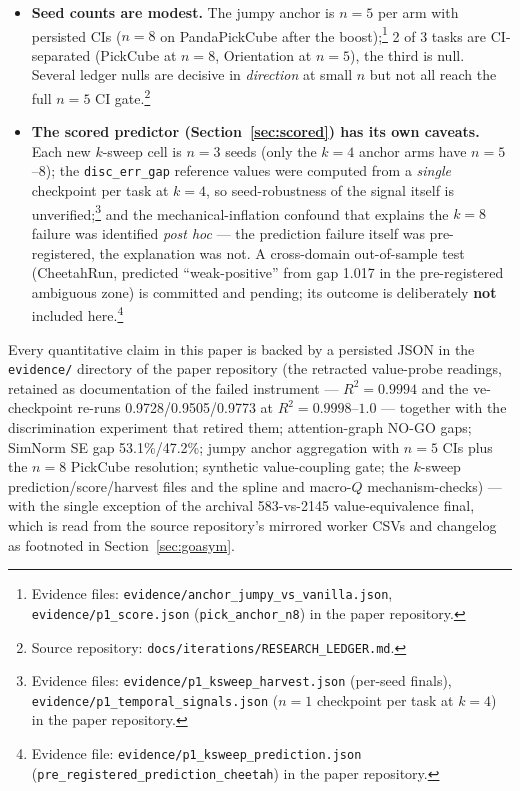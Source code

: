 \documentclass{article}
\begin{document}
\begin{itemize}
\item \textbf{Seed counts are modest.} The jumpy anchor is $n{=}5$ per arm with persisted CIs ($n{=}8$ on PandaPickCube after the boost);\footnote{Evidence files: \texttt{evidence/anchor\_jumpy\_vs\_vanilla.json}, \texttt{evidence/p1\_score.json} (\texttt{pick\_anchor\_n8}) in the paper repository.} 2 of 3 tasks are CI-separated (PickCube at $n{=}8$, Orientation at $n{=}5$), the third is null. Several ledger nulls are decisive in \emph{direction} at small $n$ but not all reach the full $n{=}5$ CI gate.\footnote{Source repository: \texttt{docs/iterations/RESEARCH\_LEDGER.md}.}

\item \textbf{The scored predictor (Section~\ref{sec:scored}) has its own caveats.} Each new $k$-sweep cell is $n{=}3$ seeds (only the $k{=}4$ anchor arms have $n{=}5$--$8$); the \texttt{disc\_err\_gap} reference values were computed from a \emph{single} checkpoint per task at $k{=}4$, so seed-robustness of the signal itself is unverified;\footnote{Evidence files: \texttt{evidence/p1\_ksweep\_harvest.json} (per-seed finals), \texttt{evidence/p1\_temporal\_signals.json} ($n{=}1$ checkpoint per task at $k{=}4$) in the paper repository.} and the mechanical-inflation confound that explains the $k{=}8$ failure was identified \emph{post hoc} --- the prediction failure itself was pre-registered, the explanation was not. A cross-domain out-of-sample test (CheetahRun, predicted ``weak-positive'' from gap 1.017 in the pre-registered ambiguous zone) is committed and pending; its outcome is deliberately \textbf{not} included here.\footnote{Evidence file: \texttt{evidence/p1\_ksweep\_prediction.json} (\texttt{pre\_registered\_prediction\_cheetah}) in the paper repository.}
\end{itemize}

Every quantitative claim in this paper is backed by a persisted JSON in the \texttt{evidence/} directory of the paper repository (the retracted value-probe readings, retained as documentation of the failed instrument --- $R^2=0.9994$ and the ve-checkpoint re-runs 0.9728/0.9505/0.9773 at $R^2=0.9998$--$1.0$ --- together with the discrimination experiment that retired them; attention-graph NO-GO gaps; SimNorm SE gap 53.1\%/47.2\%; jumpy anchor aggregation with $n{=}5$ CIs plus the $n{=}8$ PickCube resolution; synthetic value-coupling gate; the $k$-sweep prediction/score/harvest files and the spline and macro-$Q$ mechanism-checks) --- with the single exception of the archival 583-vs-2145 value-equivalence final, which is read from the source repository's mirrored worker CSVs and changelog as footnoted in Section~\ref{sec:goasym}.
\end{document}

